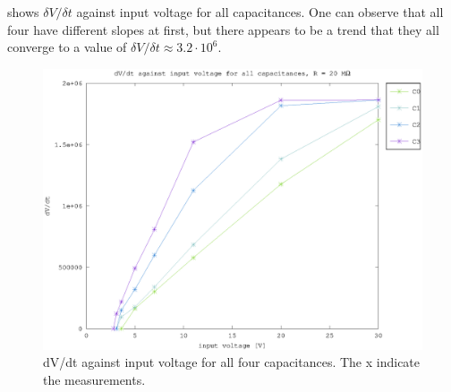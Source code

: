  shows $\delta V / \delta t$ against input voltage for all capacitances. One can observe that all four have different slopes at first, but there appears to be a trend that they all converge to a value of $\delta V/\delta t \approx 3.2\cdot10^6$.


\begin{figure}[h]
    \centering
    \includegraphics[width=\textwidth]{fig/vin_vs_time_sat.eps}
    \caption[]
        {dV/dt against input voltage for all four capacitances. The x indicate the measurements.}    
        \label{fig:e_vs_m}
\end{figure}

\clearpage

